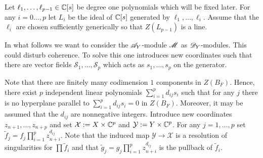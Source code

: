 Let $\ell_1,\ldots,\ell_{p-1}\in \mathbb{C}[s]$ be degree one polynomials which will be fixed later.
For any $i=0\ldots,p$ let $L_i$ be the ideal of $\mathbb{C}[s]$ generated by $\ell_1,\ldots,\ell_i$.
Assume that the $\ell_i$ are chosen sufficiently generically so that $Z(L_{p-1})$ is a line.

In what follows we want to consider the $\mathscr{A}_Y$-module $\mathscr{M}$ as $\mathscr{D}_Y$-modules.
This could disturb coherence.
To solve this one introduces new coordinates such that there are vector fields $\mathcal{S}_1,\ldots, \mathcal{S}_p$ which acts as $s_1,\ldots,s_p$ on the generator.

Note that there are finitely many codimension $1$ components in $Z(B_F)$.
Hence, there exist $p$ independent linear polynomials $\sum_{i=1}^p d_{ij}s_i$ such that for any $j$ there is no hyperplane parallel to $\sum_{i=1}^p d_{ij}s_i = 0$ in $Z(B_F)$.
Moreover, it may be assumed that the $d_{ij}$ are nonnegative integers.
Introduce new coordinates $z_{n+1}, \ldots,z_{n+p}$ and set $\mathcal{X}:= X\times \mathbb{C}^p$ and $\mathcal{Y} := Y\times \mathbb{C}^p$.
For any $j=1,\ldots, p$ set $\widetilde{f}_j = f_j\prod_{i=1}^p z_{n+i}^{d_{ij}}$.
Note that the induced map $\mathcal{Y} \to \mathcal{X}$ is a resolution of singularities for $\prod \widetilde{f}_i$ and that $\widetilde{g}_j = g_j\prod_{i=1}^p z_{n+i}^{d_{ij}}$ is the pullback of $\widetilde{f}_i$.

